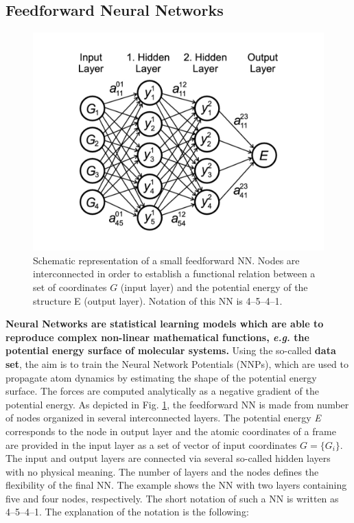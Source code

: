 \documentclass[12pt]{article}
\begin{document}
\subsection{Feedforward Neural Networks}
\begin{figure}[!h]
    \centering
    \includegraphics[scale=0.4]{NNP_scheme.jpeg}
    \caption{Schematic representation of a small feedforward NN. Nodes are interconnected in order to establish a functional relation between a set of coordinates $G$ (input layer) and the potential energy of the structure E (output layer). Notation of this NN is 4--5--4--1. }
    \label{NNP_scheme}
\end{figure}
\textbf{Neural Networks are statistical learning models which are able to reproduce complex non-linear mathematical functions, \textit{e.g.} the potential energy surface of molecular systems.} Using the so-called \textbf{data set}, the aim is to train the Neural Network Potentials (NNPs), which are used to propagate atom dynamics by estimating the shape of the potential energy surface. The forces are computed analytically as a negative gradient of the potential energy. As depicted in Fig. \ref{NNP_scheme}, the feedforward NN is made from number of nodes organized in several interconnected layers. The potential energy \textit{E} corresponds to the node in output layer and the atomic coordinates of a frame are provided in the input layer as a set of vector of input coordinates $G=\{G_i\}$. The input and output layers are connected via several so-called hidden layers with no physical meaning. The number of layers and the nodes defines the flexibility of the final NN. The example shows the NN with two layers containing five and four nodes, respectively. The short notation of such a NN is written as 4--5--4--1. The explanation of the notation is the following:
\end{document}

